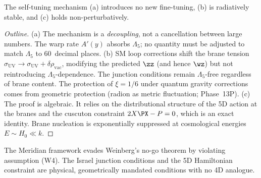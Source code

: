 \begin{theorem}
\label{thm:1-rigidity}
The self-tuning mechanism (a) introduces no new fine-tuning, (b) is radiatively stable, and (c) holds non-perturbatively.
\end{theorem}

\begin{proof}[Outline]
(a) The mechanism is a \emph{decoupling}, not a cancellation between large numbers. The warp rate $A'(y)$ absorbs $\Lambda_5$; no quantity must be adjusted to match $\Lambda_5$ to 60~decimal places.
(b) SM loop corrections shift the brane tension $\sigma_\mathrm{UV} \to \sigma_\mathrm{UV} + \delta\rho_\mathrm{vac}$, modifying the predicted $\zz$ (and hence $\wz$) but not reintroducing $\Lambda_5$-dependence. The junction conditions remain $\Lambda_5$-free regardless of brane content. The protection of $\xi = 1/6$ under quantum gravity corrections comes from geometric protection (radion as metric fluctuation; Phase~13P).
(c) The proof is algebraic. It relies on the distributional structure of the 5D action at the branes and the cuscuton constraint $2X\PX - P = 0$, which is an exact identity. Brane nucleation is exponentially suppressed at cosmological energies $E \sim H_0 \ll k$. \qedhere
\end{proof}

\begin{theorem}
\label{thm:1-weinberg-evasion}
The Meridian framework evades Weinberg's no-go theorem by violating assumption (W4). The Israel junction conditions and the 5D Hamiltonian constraint are physical, geometrically mandated conditions with no 4D analogue.
\end{theorem}

